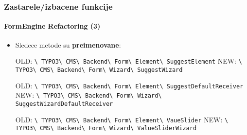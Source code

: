 \begin{frame}[fragile]
	\frametitle{Zastarele/izbacene funkcije}
	\framesubtitle{FormEngine Refactoring (3)}

	\begin{itemize}

		\item Sledece metode su \textbf{preimenovane}:\newline

			\smaller
				OLD:\tabto{0.8cm}
					\texttt{\textbackslash
						TYPO3\textbackslash
						CMS\textbackslash
						Backend\textbackslash
						Form\textbackslash
						Element\textbackslash
						SuggestElement}\newline
				NEW:\tabto{0.8cm}
					\texttt{\textbackslash
						TYPO3\textbackslash
						CMS\textbackslash
						Backend\textbackslash
						Form\textbackslash
						Wizard\textbackslash
						SuggestWizard}\newline

				OLD:\tabto{0.8cm}
					\texttt{\textbackslash
						TYPO3\textbackslash
						CMS\textbackslash
						Backend\textbackslash
						Form\textbackslash
						Element\textbackslash
						SuggestDefaultReceiver}\newline
				NEW:\tabto{0.8cm}
					\texttt{\textbackslash
						TYPO3\textbackslash
						CMS\textbackslash
						Backend\textbackslash
						Form\textbackslash
						Wizard\textbackslash
						SuggestWizardDefaultReceiver}\newline

				OLD:\tabto{0.8cm}
					\texttt{\textbackslash
						TYPO3\textbackslash
						CMS\textbackslash
						Backend\textbackslash
						Form\textbackslash
						Element\textbackslash
						VaueSlider}\newline
				NEW:\tabto{0.8cm}
					\texttt{\textbackslash
						TYPO3\textbackslash
						CMS\textbackslash
						Backend\textbackslash
						Form\textbackslash
						Wizard\textbackslash
						ValueSliderWizard}\newline

			\normalsize

	\end{itemize}

\end{frame}


